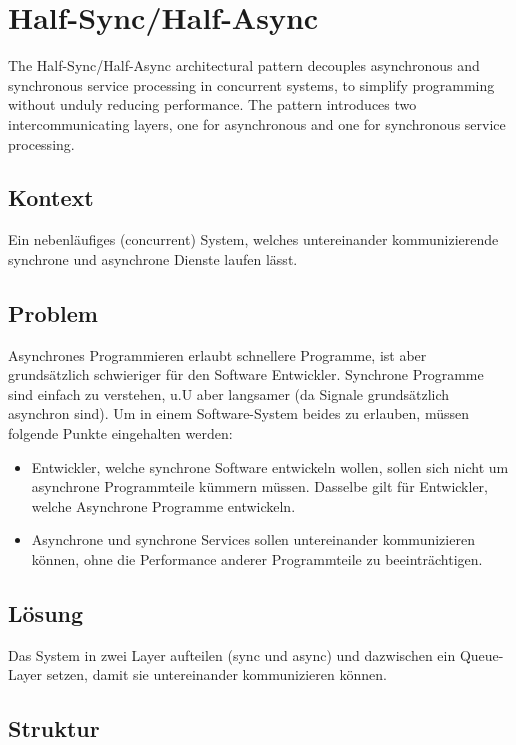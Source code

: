 \section{Half-Sync/Half-Async}

The Half-Sync/Half-Async architectural pattern decouples asynchronous and synchronous service processing in concurrent systems, to simplify programming without unduly reducing performance. The pattern introduces two intercommunicating layers, one for asynchronous and one for synchronous service processing.

\subsection*{Kontext}

Ein nebenläufiges (concurrent) System, welches untereinander kommunizierende synchrone und asynchrone Dienste laufen lässt.

\subsection*{Problem}

Asynchrones Programmieren erlaubt schnellere Programme, ist aber grundsätzlich schwieriger für den Software Entwickler.
Synchrone Programme sind einfach zu verstehen, u.U aber langsamer (da Signale grundsätzlich asynchron sind).
Um in einem Software-System beides zu erlauben, müssen folgende Punkte eingehalten werden:

\begin{itemize}
	\item Entwickler, welche synchrone Software entwickeln wollen, sollen sich nicht um asynchrone Programmteile kümmern müssen. Dasselbe gilt für Entwickler, welche Asynchrone Programme entwickeln.
	\item Asynchrone und synchrone Services sollen untereinander kommunizieren können, ohne die Performance anderer Programmteile zu beeinträchtigen.
\end{itemize}

\subsection*{Lösung}

Das System in zwei Layer aufteilen (sync und async) und dazwischen ein Queue-Layer setzen, damit sie untereinander kommunizieren können.

\subsection*{Struktur}

